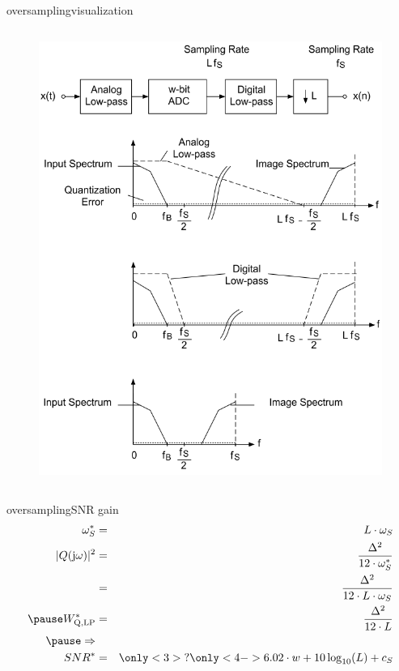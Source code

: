 	\begin{frame}{oversampling}{visualization}
        \vspace{-8mm}
        \begin{columns}
		\begin{figure}
			\centering
				\includegraphics[scale=.32]{Graph/oversampling2}
		\end{figure}
        \end{columns}
	\end{frame}	
	\begin{frame}{oversampling}{SNR gain}
		\begin{eqnarray*}
			\omega^\ast_S &=& L\cdot \omega_S\\
            \bigskip
			|Q(\jom)|^2 &=& \frac{\Delta^2}{12\cdot \omega^\ast_S}\\
			&=& \frac{\Delta^2}{12\cdot L\cdot \omega_S}\\
			\pause
            \bigskip
			W^\ast_\mathrm{Q,LP} &=& \frac{\Delta^2}{12\cdot L}\\
			\pause
            \bigskip
            \Rightarrow&&\\
			SNR^\ast &=& \only<3>{?}\only<4->{6.02\cdot w + 10\log_{10} (L) + c_S}
		\end{eqnarray*}
	\end{frame}	

